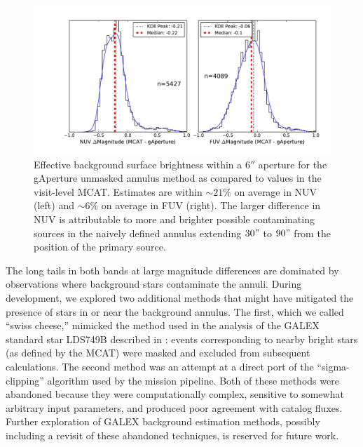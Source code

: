 \documentclass[iop]{emulateapj}
\begin{document}
\begin{figure}[h]
\includegraphics[scale=0.3]{Fig03.pdf}
\caption{Effective background surface brightness within a $6''$ aperture for the gAperture unmasked annulus method as compared to values in the visit-level MCAT. Estimates are within $\sim 21\%$ on average in NUV (left) and $\sim 6\%$ on average in FUV (right). The larger difference in NUV is attributable to more and brighter possible contaminating sources in the naively defined annulus extending $30"$ to $90"$ from the position of the primary source.
\label{bgrelphot}}
\end{figure}

The long tails in both bands at large magnitude differences are dominated by observations where background stars contaminate the annuli. During development, we explored two additional methods that might have mitigated the presence of stars in or near the background annulus. The first, which we called ``swiss cheese,'' mimicked the method used in the analysis of the GALEX standard star LDS749B described in \citep{mor2007}: events corresponding to nearby bright stars (as defined by the MCAT) were masked and excluded from subsequent calculations. The second method was an attempt at a direct port of the ``sigma-clipping'' algorithm used by the mission pipeline. Both of these methods were abandoned because they were computationally complex, sensitive to somewhat arbitrary input parameters, and produced poor agreement with catalog fluxes. Further exploration of GALEX background estimation methods, possibly including a revisit of these abandoned techniques, is reserved for future work.
\end{document}
